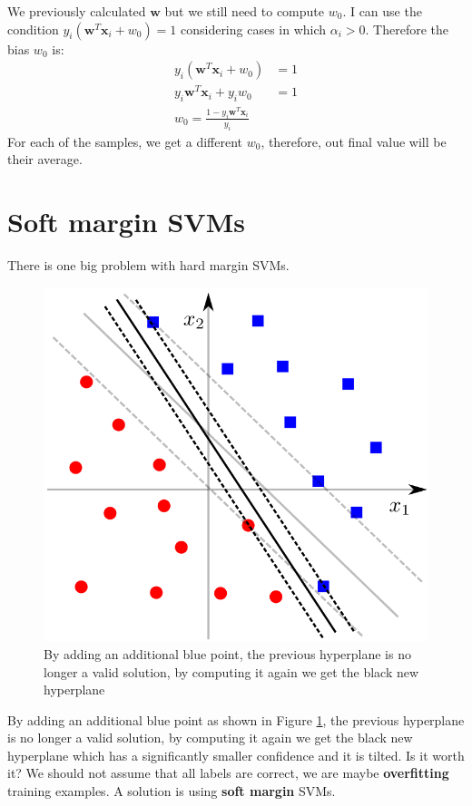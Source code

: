             We previously calculated $\pmb{w}$ but we still need to compute $w_0$. 
            I can use the condition $y_i(\pmb{w}^T \pmb{x}_i + w_0) = 1$ considering cases in which $\alpha_i > 0$. 
            Therefore the bias $w_0$ is:
            \begin{align*}
                 y_i(\pmb{w}^T \pmb{x}_i + w_0) &= 1\\
                 y_i\pmb{w}^T \pmb{x}_i  + y_i w_0 &= 1\\
                 w_0 = \frac{1 - y_i\pmb{w}^T \pmb{x}_i}{y_i}
            \end{align*}
            For each of the samples, we get a different $w_0$, therefore, out final value will be their average.

\section{Soft margin SVMs}
    There is one big problem with hard margin SVMs.
    \begin{figure}[ht]
        \centering
        \includegraphics[scale=0.3]{images/hardSVMs_problems.png}
        \caption{By adding an additional blue point, the previous hyperplane is no longer a valid solution, by computing it again we get the black new hyperplane}
        \label{fig:hardSVM_problem}
    \end{figure}
    By adding an additional blue point as shown in Figure \ref{fig:hardSVM_problem}, the previous hyperplane is no longer a valid solution, by computing it again we get the black new hyperplane which has a significantly smaller confidence and it is tilted. Is it worth it?
    We should not assume that all labels are correct, we are maybe \textbf{overfitting} training examples. 
    A solution is using \textbf{soft margin} SVMs.\\

